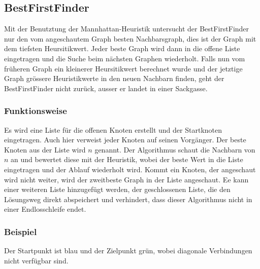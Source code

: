 \subsection{BestFirstFinder}

Mit der Benutztung der Mannhattan-Heuristik untersucht der BestFirstFinder 
nur den vom angeschautem Graph besten Nachbarsgraph, dies ist der Graph mit dem tiefsten
Heursitikwert. Jeder beste Graph wird dann in die offene Liste eingetragen und die Suche
beim nächsten Graphen wiederholt. Falls nun vom früheren Graph ein kleinerer Heursitikwert
berechnet wurde und der jetztige Graph grössere Heuristikwerte in den neuen Nachbarn finden,
geht der BestFirstFinder nicht zurück, ausser er landet in einer Sackgasse.

\subsubsection{Funktionsweise}

Es wird eine Liste für die offenen Knoten erstellt und der Startknoten 
eingetragen. Auch hier verweist jeder Knoten auf seinen Vorgänger.
Der beste Knoten aus der Liste wird $n$ genannt. Der Algorithmus schaut die Nachbarn von $n$
an und bewertet diese mit der Heuristik, wobei der beste Wert in die Liste
eingetragen und der Ablauf wiederholt wird. Kommt ein Knoten, der
angeschaut wird nicht weiter, wird der zweitbeste Graph in der Liste
angeschaut. Ee kann einer weiteren Liste hinzugefügt werden, der
geschlossenen Liste, die den Lösungsweg direkt  abspeichert und
verhindert, dass dieser Algorithmus nicht in einer Endlosschleife endet.
\cite[Roblox Developer, 2018]{robdevbff}

\subsubsection{Beispiel}

Der Startpunkt ist blau und der Zielpunkt grün, wobei diagonale Verbindungen nicht verfügbar sind.

